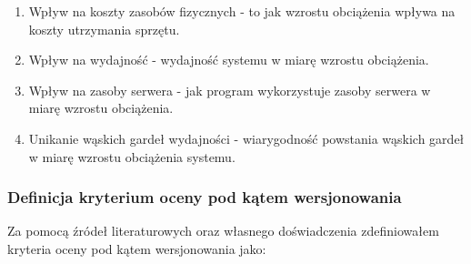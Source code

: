 \documentclass[runningheads,12pt]{llncs}
\begin{document}
\begin{enumerate}
    \item Wpływ na koszty zasobów fizycznych - to jak wzrostu obciążenia wpływa na koszty utrzymania sprzętu.
    \item Wpływ na wydajność - wydajność systemu w miarę wzrostu obciążenia.
    \item Wpływ na zasoby serwera - jak program wykorzystuje zasoby serwera w miarę wzrostu obciążenia.
    \item Unikanie wąskich gardeł wydajności - wiarygodność powstania wąskich gardeł w miarę wzrostu obciążenia systemu.
\end{enumerate}

\subsubsection{Definicja kryterium oceny pod kątem wersjonowania}

Za pomocą źródeł literaturowych oraz własnego doświadczenia zdefiniowałem kryteria oceny pod kątem wersjonowania jako:
\end{document}
